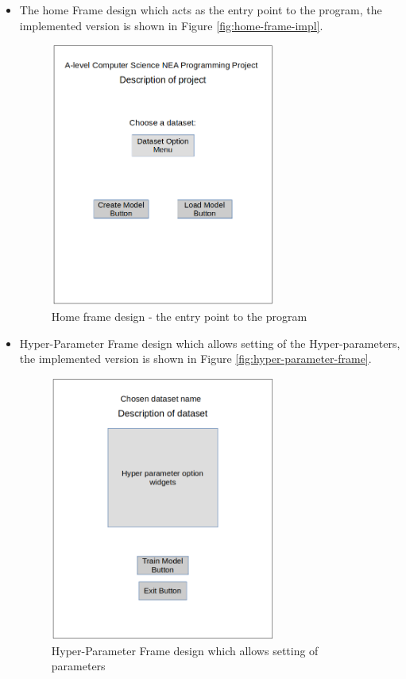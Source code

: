 \documentclass[./project-report/src/latex/project-report.tex]{subfiles}
\begin{document}
\begin{itemize}
    \item The home Frame design which acts as the entry point to the program, the implemented version is shown in Figure \ref{fig:home-frame-impl}.
        \begin{figure}[h!]
        \centering
        \includegraphics[width=0.7\textwidth]{./project-report/src/images/home-frame-design.png}
        \caption{Home frame design - the entry point to the program}
        \label{fig:home-frame-design}
        \end{figure}

    \pagebreak

    \item Hyper-Parameter Frame design which allows setting of the Hyper-parameters, the implemented version is shown in Figure \ref{fig:hyper-parameter-frame}.
        \begin{figure}[h!]
        \centering
        \includegraphics[width=0.7\textwidth]{./project-report/src/images/hyper-parameter-frame-design.png}
        \caption{Hyper-Parameter Frame design which allows setting of parameters}
        \label{fig:hyper-parameter-frame-design}
        \end{figure}


\end{itemize}
\end{document}
